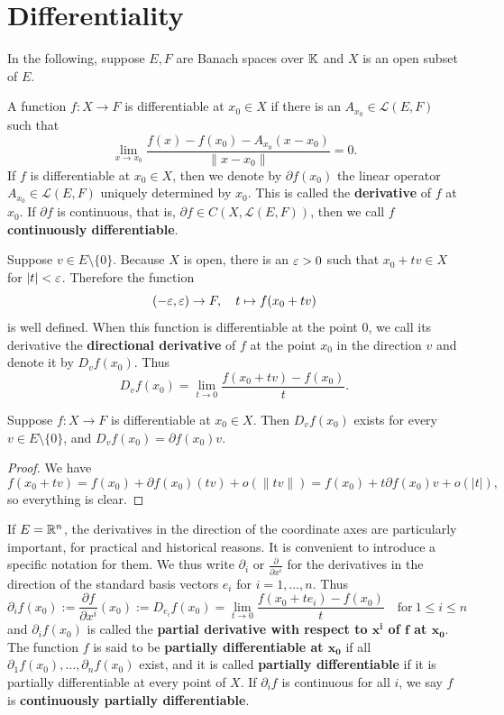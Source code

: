 \chapter{Differentiality}
In the following, suppose $E,F$ are Banach spaces over $\mathbb{K}$ and $X$ is an open subset of $E$.
\begin{definition}
A function $f:X\to F$ is differentiable at $x_0\in X$ if there is an $A_{x_0}\in\mathcal{L}(E,F)$ such that 
\[\lim_{x\to x_0}\dfrac{f(x)-f(x_0)-A_{x_0}(x-x_0)}{\|x-x_0\|}=0.\]
If $f$ is differentiable at $x_0\in X$, then we denote by $\partial f(x_0)$ the linear operator $A_{x_0}\in \mathcal{L}(E,F)$ uniquely determined by $x_0$. This is called the \textbf{derivative} of $f$ at $x_0$. If $\partial f$ is continuous, that is, $\partial f\in C(X,\mathcal{L}(E,F))$, then we call $f$ \textbf{continuously differentiable}.\par
Suppose $v \in E\setminus\{0\}$. Because $X$ is open, there is an $\varepsilon>0$ such that $x_0+tv\in X$ for $|t|<\varepsilon$. Therefore the function
\[(-\varepsilon,\varepsilon)\to F,\quad t\mapsto f(x_0+tv)\]
is well defined. When this function is differentiable at the point $0$, we call its derivative the \textbf{directional derivative} of $f$ at the point $x_0$ in the direction $v$ and denote it by $D_{v}f(x_0)$. Thus
\[D_{v}f(x_0)=\lim_{t\to 0}\dfrac{f(x_0+tv)-f(x_0)}{t}.\]
\end{definition}
\begin{proposition}\label{direct derivetive}
Suppose $f : X\to F$ is differentiable at $x_0\in X$. Then $D_vf(x_0)$ exists for every $v\in E\setminus\{0\}$, and $D_vf(x_0) = \partial f(x_0)v$.
\end{proposition}
\begin{proof}
We have
\[f(x_0+tv)=f(x_0)+\partial f(x_0)(tv)+o(\|tv\|)=f(x_0)+t\partial f(x_0)v+o(|t|),\]
so everything is clear.
\end{proof}
\begin{definition}
If $E=\mathbb{R}^n$, the derivatives in the direction of the coordinate axes are particularly important, for practical and historical reasons. It is convenient to introduce a specific notation for them. We thus write $\partial_i$ or $\frac{\partial}{\partial x^i}$ for the derivatives in the direction of the standard basis vectors $e_i$ for $i=1,\dots, n$. Thus
\[\partial_if(x_0):=\dfrac{\partial f}{\partial x^i}(x_0):=D_{e_i}f(x_0)=\lim_{t\to0}\dfrac{f(x_0+te_i)−f(x_0)}{t}\quad \text{for}\ 1\leq i\leq n\]
and $\partial_if(x_0)$ is called the \textbf{partial derivative with respect to $\bm{x^i}$ of $\bm{f}$ at $\bm{x_0}$}. The function $f$ is said to be \textbf{partially differentiable at $\bm{x_0}$} if all $\partial_1f(x_0),\dots,\partial_nf(x_0)$ exist, and it is called \textbf{partially differentiable} if it is partially differentiable at every point of $X$. If $\partial_if$ is continuous for all $i$, we say $f$ is \textbf{continuously partially differentiable}.
\end{definition}
